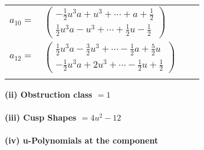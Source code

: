 \documentclass[1p]{elsarticle_modified}
\theoremstyle{definition}
\begin{document}
\begin{tabular}{m{7pt} m{180pt} m{7pt} m{180pt} }
\flushright $a_{10}=$&$\begin{pmatrix}-\frac{1}{2} u^3 a+u^3+\cdots+a+\frac{1}{2}\\\frac{1}{2} u^3 a- u^3+\cdots+\frac{1}{2} u-\frac{1}{2}\end{pmatrix}$ \\
\flushright $a_{12}=$&$\begin{pmatrix}\frac{1}{2} u^3 a-\frac{3}{2} u^3+\cdots-\frac{1}{2} a+\frac{5}{2} u\\-\frac{1}{2} u^3 a+2 u^3+\cdots-\frac{1}{2} u+\frac{1}{2}\end{pmatrix}$\\&\end{tabular}
\flushleft \textbf{(ii) Obstruction class $= 1$}\\~\\
\flushleft \textbf{(iii) Cusp Shapes $= 4 u^2-12$}\\~\\
\newpage\renewcommand{\arraystretch}{1}
\flushleft \textbf{(iv) u-Polynomials at the component}\newline \\
\end{document}
